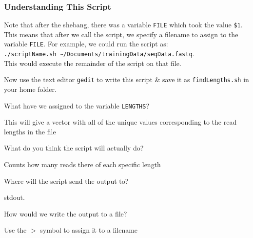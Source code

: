 \documentclass[a4paper,12pt,twoside]{memoir}
\begin{document}
\subsubsection*{Understanding This Script}
Note that after the shebang, there was a variable \texttt{FILE} which took the value \texttt{\$1}.
This means that after we call the script, we specify a filename to assign to the variable \texttt{FILE}.
For example, we could run the script as: \\
\texttt{./scriptName.sh \~{}/Documents/trainingData/seqData.fastq}.\\
This would execute the remainder of the script on that file. \\

\begin{steps}
Now use the text editor \texttt{gedit} to write this script \& save it as \texttt{findLengths.sh} in your home folder.
\end{steps}

\begin{questions}
What have we assigned to the variable \texttt{LENGTHS}?
\begin{answer}
This will give a vector with all of the unique values corresponding to the read lengths in the file
\end{answer}

What do you think the script will actually do?
\begin{answer}
Counts how many reads there of each specific length
\end{answer}

Where will the script send the output to?
\begin{answer}
stdout.
\end{answer}

How would we write the output to a file?
\begin{answer}
Use the $>$ symbol to assign it to a filename
\end{answer}
\end{questions}
\end{document}
